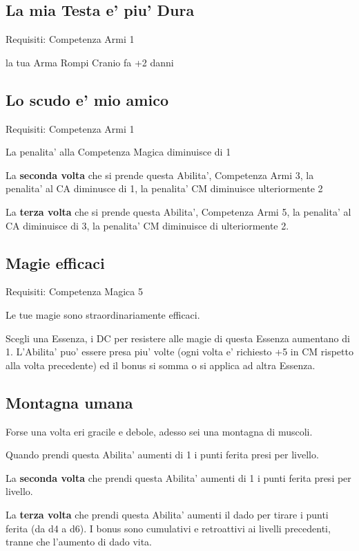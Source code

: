 \documentclass[a4paper,11pt,twoside,openany]{book}
\begin{document}
\subsection{La mia Testa e' piu' Dura}

Requisiti: Competenza Armi 1

la tua Arma Rompi Cranio fa +2 danni

\subsection{Lo scudo e' mio amico}

Requisiti: Competenza Armi 1

La penalita' alla Competenza Magica diminuisce di 1

La \textbf{seconda volta} che si prende questa Abilita', Competenza Armi 3, la penalita' al CA diminusce di 1, la penalita' CM diminuisce ulteriormente 2

La \textbf{terza volta} che si prende questa Abilita', Competenza Armi 5, la penalita' al CA diminuisce di 3, la penalita' CM diminuisce di ulteriormente 2.

\subsection{Magie efficaci}

Requisiti: Competenza Magica 5

Le tue magie sono straordinariamente efficaci.

Scegli una Essenza, i DC per resistere alle magie di questa Essenza aumentano di 1. L'Abilita' puo' essere presa piu' volte (ogni volta e' richiesto +5 in CM rispetto alla volta precedente) ed il bonus si somma o si applica ad altra Essenza.

\subsection{Montagna umana}

Forse una volta eri gracile e debole, adesso sei una montagna di muscoli.

Quando prendi questa Abilita' aumenti di 1 i punti ferita presi per livello.

La \textbf{seconda volta} che prendi questa Abilita' aumenti di 1 i punti ferita presi per livello. 

La \textbf{terza volta} che prendi questa Abilita' aumenti il dado per tirare i punti ferita (da d4 a d6).
I bonus sono cumulativi e retroattivi ai livelli precedenti, tranne che l’aumento di dado vita.
\end{document}
